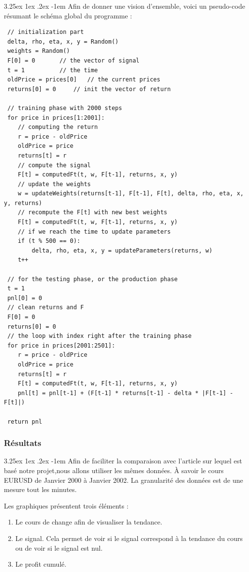 \documentclass[a4paper, 11pt]{article}
\makeatletter
\renewcommand\paragraph{\@startsection{paragraph}{5}{\z@}%
  {3.25ex \@plus1ex \@minus.2ex}%
  {-1em}%
  {\normalfont\normalsize\bfseries}}
\makeatother
\begin{document}
\paragraph{}
Afin de donner une vision d'ensemble, voici un pseudo-code résumant le schéma global du programme :
  \begin{lstlisting}
 // initialization part
 delta, rho, eta, x, y = Random()
 weights = Random()
 F[0] = 0		// the vector of signal
 t = 1			// the time
 oldPrice = prices[0]	// the current prices
 returns[0] = 0		// init the vector of return
 
 // training phase with 2000 steps
 for price in prices[1:2001]:
 	// computing the return
 	r = price - oldPrice
 	oldPrice = price
 	returns[t] = r
 	// compute the signal
 	F[t] = computedFt(t, w, F[t-1], returns, x, y)
 	// update the weights
 	w = updateWeights(returns[t-1], F[t-1], F[t], delta, rho, eta, x, y, returns)
 	// recompute the F[t] with new best weights
 	F[t] = computedFt(t, w, F[t-1], returns, x, y)
 	// if we reach the time to update parameters
 	if (t % 500 == 0):
 		delta, rho, eta, x, y = updateParameters(returns, w)
 	t++
 
 // for the testing phase, or the production phase
 t = 1
 pnl[0] = 0
 // clean returns and F
 F[0] = 0
 returns[0] = 0
 // the loop with index right after the training phase
 for price in prices[2001:2501]:
 	r = price - oldPrice
 	oldPrice = price
 	returns[t] = r
 	F[t] = computedFt(t, w, F[t-1], returns, x, y)
 	pnl[t] = pnl[t-1] + (F[t-1] * returns[t-1] - delta * |F[t-1] - F[t]|)
 
 return pnl
  \end{lstlisting}
 
\subsubsection{Résultats}
 \paragraph{}
 Afin de faciliter la comparaison avec l'article sur lequel est basé notre projet,nous allons utiliser les mêmes données. À savoir le cours EURUSD de Janvier 2000 à Janvier 2002. La granularité des données est de une mesure tout les minutes.
 
 Les graphiques présentent trois éléments :
 \begin{enumerate}
  \item Le cours de change afin de visualiser la tendance.
  \item Le signal. Cela permet de voir si le signal correspond à la tendance du cours ou de voir si le signal est nul.
  \item Le profit cumulé.
 \end{enumerate}
\end{document}
